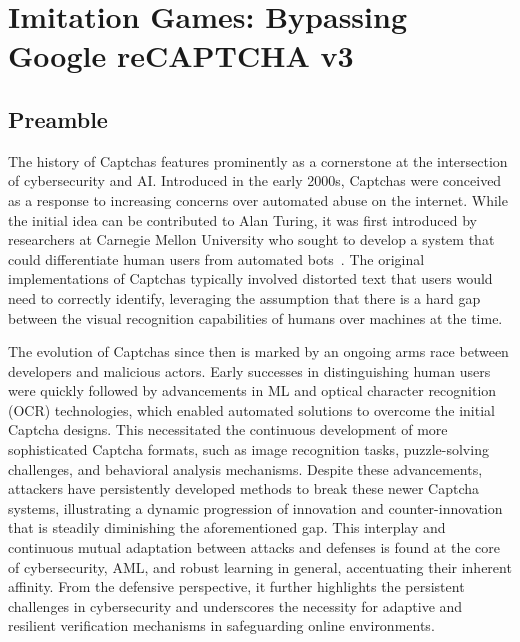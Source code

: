 \chapter{Imitation Games: Bypassing Google reCAPTCHA v3}\label{ch:recaptcha}
\label{ch:captcha}

\section*{Preamble}

The history of Captchas features prominently as a cornerstone at the intersection of cybersecurity and \gls{AI}.
Introduced in the early 2000s, Captchas were conceived as a response to increasing concerns over automated abuse on the internet.
While the initial idea can be contributed to Alan Turing, it was first introduced by researchers at Carnegie Mellon University who sought to develop a system that could differentiate human users from automated bots~\cite{von2003captcha}.
The original implementations of Captchas typically involved distorted text that users would need to correctly identify, leveraging the assumption that there is a hard gap between  the visual recognition capabilities of humans over machines at the time.

The evolution of Captchas since then is marked by an ongoing arms race between developers and malicious actors.
Early successes in distinguishing human users were quickly followed by advancements in \gls{ML} and optical character recognition (OCR) technologies, which enabled automated solutions to overcome the initial Captcha designs.
This necessitated the continuous development of more sophisticated Captcha formats, such as image recognition tasks, puzzle-solving challenges, and behavioral analysis mechanisms.
Despite these advancements, attackers have persistently developed methods to break these newer Captcha systems, illustrating a dynamic progression of innovation and counter-innovation that is steadily diminishing the aforementioned gap.
This interplay and continuous mutual adaptation between attacks and defenses is found at the core of cybersecurity, \gls{AML}, and robust learning in general, accentuating their inherent affinity.
From the defensive perspective, it further highlights the persistent challenges in cybersecurity and underscores the necessity for adaptive and resilient verification mechanisms in safeguarding online environments.

